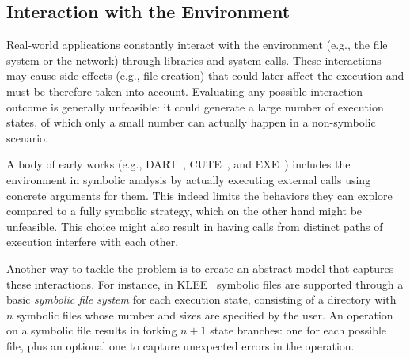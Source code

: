 \subsection{Interaction with the Environment}
\label{ss:environment}

Real-world applications constantly interact with the environment (e.g., the file system or the network) through libraries and system calls. These interactions may cause side-effects (e.g., file creation)
that could later affect the execution and must be therefore taken into account. Evaluating any possible interaction outcome is generally unfeasible: it could generate a large number of execution states, of which only a small number can actually happen in a non-symbolic scenario.


A body of early works (e.g., {\sc DART}~\cite{DART-PLDI05},  {\sc CUTE}~\cite{CUTE-FSE13}, and {\sc EXE}~\cite{EXE-CCS06}) includes the environment in symbolic analysis by actually executing external calls using concrete arguments for them. This indeed limits the behaviors they can explore compared to a fully symbolic strategy, which on the other hand might be unfeasible.
This choice might also result in having calls from distinct paths of execution interfere with each other. 

Another way to tackle the problem is to create an abstract model that captures these interactions. For instance, in {\sc KLEE}~\cite{KLEE-OSDI08} symbolic files are supported through a basic {\em symbolic file system} for each execution state, consisting of a directory with $n$ symbolic files whose number and sizes are specified by the user. An operation on a symbolic file results in forking $n+1$ state branches: one for each possible file, plus an optional one to capture unexpected errors in the operation.

